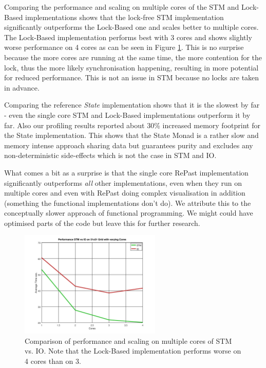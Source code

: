 Comparing the performance and scaling on multiple cores of the STM and Lock-Based implementations shows that the lock-free STM implementation significantly outperforms the Lock-Based one and scales better to multiple cores. The Lock-Based implementation performs best with 3 cores and shows slightly worse performance on 4 cores as can be seen in Figure \ref{fig:core_duration_stm_io}. This is no surprise because the more cores are running at the same time, the more contention for the lock, thus the more likely synchronisation happening, resulting in more potential for reduced performance. This is not an issue in STM because no locks are taken in advance. 

Comparing the reference \textit{State} implementation shows that it is the slowest by far - even the single core STM and Lock-Based implementations outperform it by far. Also our profiling results reported about 30\% increased memory footprint for the State implementation. This shows that the State Monad is a rather slow and memory intense approach sharing data but guarantees purity and excludes any non-deterministic side-effects which is not the case in STM and IO.

What comes a bit as a surprise is that the single core RePast implementation significantly outperforms \textit{all} other implementations, even when they run on multiple cores and even with RePast doing complex visualisation in addition (something the functional implementations don't do). We attribute this to the conceptually slower approach of functional programming. We might could have optimised parts of the code but leave this for further research.

\begin{figure}
	\centering
	\includegraphics[width=0.6\textwidth, angle=0]{./fig/sir/core_duration_stm_io.png}
	\caption{Comparison of performance and scaling on multiple cores of STM vs. IO. Note that the Lock-Based implementation performs worse on 4 cores than on 3.}
	\label{fig:core_duration_stm_io}
\end{figure}

